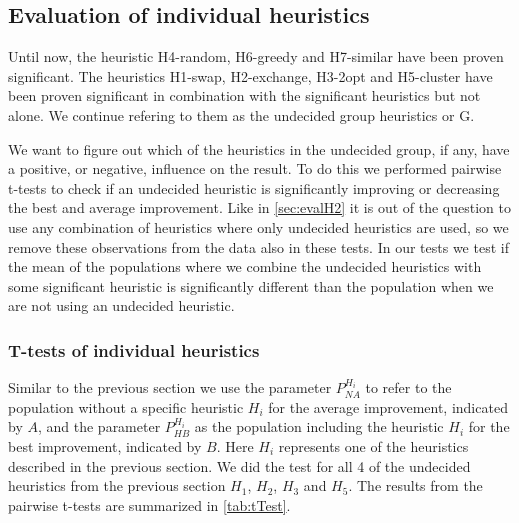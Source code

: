\documentclass[../main.tex]{subfiles}
\begin{document}
\subsection{Evaluation of individual heuristics}
\label{sec:evalI}
Until now, the heuristic H4-random, H6-greedy and H7-similar have been proven significant.
The heuristics H1-swap, H2-exchange, H3-2opt and H5-cluster have been proven significant in combination with the significant heuristics but not alone.
We continue refering to them as the undecided group heuristics or G. 
\par
We want to figure out which of the heuristics in the undecided group, if any, have a positive, or negative, influence on the result.
To do this we performed pairwise t-tests to check if an undecided heuristic is significantly improving or decreasing the best and average improvement.
Like in \cref{sec:evalH2} it is out of the question to use any combination of heuristics where only undecided heuristics are used, so we remove these observations from the data also in these tests.
In our tests we test if the mean of the populations where we combine the undecided heuristics with some significant heuristic is significantly different than the population when we are not using an undecided heuristic. 

\subsubsection{T-tests of individual heuristics}
Similar to the previous section we use the parameter $P^{H_i}_{NA}$ to refer to the population without a specific heuristic $H_i$ for the average improvement, indicated by $A$, and the parameter $P^{H_i}_{HB}$ as the population including the heuristic $H_i$ for the best improvement, indicated by $B$. 
Here $H_i$ represents one of the heuristics described in the previous section. 
We did the test for all 4 of the undecided heuristics from the previous section $H_1$, $H_2$, $H_3$ and $H_5$.
The results from the pairwise t-tests are summarized in \cref{tab:tTest}.
\end{document}
